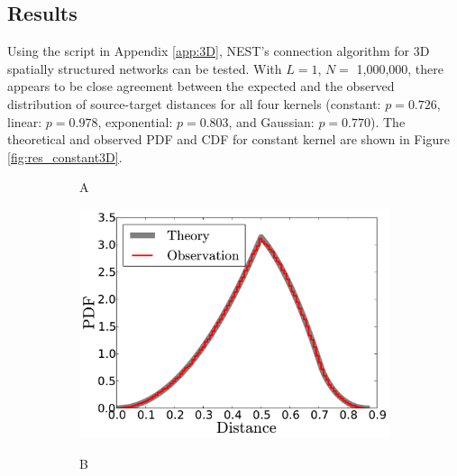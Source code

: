 \subsection{Results\label{subsec:3D_res}}

\graphicspath{{figs/spatial/3D_results/}}

Using the script in Appendix \ref{app:3D}, NEST's connection algorithm for 3D spatially structured networks can be tested. With $L = 1$, $N =$ 1,000,000, there appears to be close agreement between the expected and the observed distribution of source-target distances for all four kernels (constant: $p = 0.726$, linear: $p = 0.978$, exponential: $p = 0.803$, and Gaussian: $p = 0.770$). The theoretical and observed PDF and CDF for constant kernel are shown in Figure \ref{fig:res_constant3D}. 
\begin{figure}[t]
\centering
\begin{subfigure}[b]{0.49\textwidth}
	  \begin{flushleft}
	  \large A
		\end{flushleft}
    \centering
    \includegraphics[width=\textwidth]{3D_constant_PDF.pdf}
    \label{subfig:res_3D_constant_PDF}
\end{subfigure}
\begin{subfigure}[b]{0.49\textwidth}
	  \begin{flushleft}
	  \large B
		\end{flushleft}
    \centering

\end{subfigure}
\end{figure}
